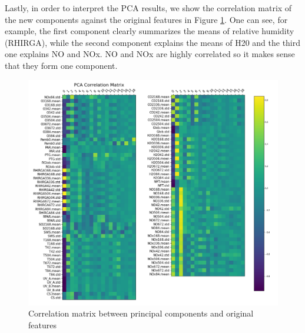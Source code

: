 Lastly, in order to interpret the PCA results, we show the correlation matrix of the new components against the original features in Figure \ref{fig:pca_correlation_matrix}. One can see, for example, the first component clearly summarizes the means of relative humidity (RHIRGA), while the second component explains the means of H20 and the third one explains NO and NOx. NO and NOx are highly correlated so it makes sense that they form one component.

\begin{figure}[!ht]
   \centering
   \includegraphics[width=\textwidth]{images/pca_correlation_matrix.png}
   \caption{Correlation matrix between principal components and original features}
   \label{fig:pca_correlation_matrix}
\end{figure}
